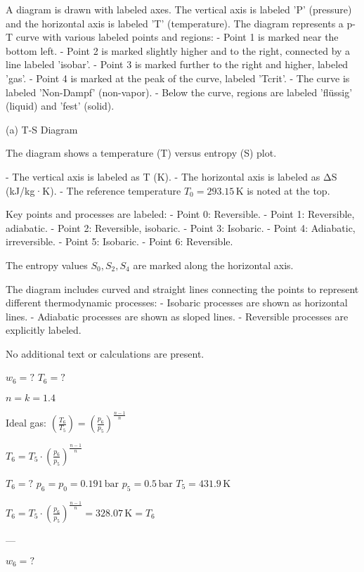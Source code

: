A diagram is drawn with labeled axes. The vertical axis is labeled 'P' (pressure) and the horizontal axis is labeled 'T' (temperature). The diagram represents a p-T curve with various labeled points and regions:  
- Point 1 is marked near the bottom left.  
- Point 2 is marked slightly higher and to the right, connected by a line labeled 'isobar'.  
- Point 3 is marked further to the right and higher, labeled 'gas'.  
- Point 4 is marked at the peak of the curve, labeled 'Tcrit'.  
- The curve is labeled 'Non-Dampf' (non-vapor).  
- Below the curve, regions are labeled 'flüssig' (liquid) and 'fest' (solid).

(a) T-S Diagram  

The diagram shows a temperature (T) versus entropy (S) plot.  

- The vertical axis is labeled as T (K).  
- The horizontal axis is labeled as ΔS (kJ/kg·K).  
- The reference temperature \( T_0 = 293.15 \, \text{K} \) is noted at the top.  

Key points and processes are labeled:  
- Point 0: Reversible.  
- Point 1: Reversible, adiabatic.  
- Point 2: Reversible, isobaric.  
- Point 3: Isobaric.  
- Point 4: Adiabatic, irreversible.  
- Point 5: Isobaric.  
- Point 6: Reversible.  

The entropy values \( S_0, S_2, S_4 \) are marked along the horizontal axis.  

The diagram includes curved and straight lines connecting the points to represent different thermodynamic processes:  
- Isobaric processes are shown as horizontal lines.  
- Adiabatic processes are shown as sloped lines.  
- Reversible processes are explicitly labeled.  

No additional text or calculations are present.

\( w_6 = ? \)  
\( T_6 = ? \)  

\( n = k = 1.4 \)  

Ideal gas:  
\( \left( \frac{T_6}{T_5} \right) = \left( \frac{p_6}{p_5} \right)^{\frac{n-1}{n}} \)  

\( T_6 = T_5 \cdot \left( \frac{p_6}{p_5} \right)^{\frac{n-1}{n}} \)  

\( T_6 = ? \)  
\( p_6 = p_0 = 0.191 \, \text{bar} \)  
\( p_5 = 0.5 \, \text{bar} \)  
\( T_5 = 431.9 \, \text{K} \)  

\( T_6 = T_5 \cdot \left( \frac{p_6}{p_5} \right)^{\frac{n-1}{n}} = 328.07 \, \text{K} = T_6 \)  

---

\( w_6 = ? \)  

